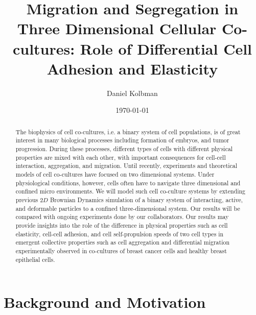 \documentclass[aps,prb,twocolumn,groupedaddress,nofootinbib,floatfix]{revtex4}
\begin{document}
%
\title{Migration and Segregation in Three Dimensional Cellular Co-cultures: Role of
Differential Cell Adhesion and Elasticity}

%
\author{Daniel Kolbman}
%
%
%

\date{\today}

\begin{abstract} \noindent The biophysics of cell co-cultures, i.e. a binary system of cell populations, is of great interest in many biological processes including formation of embryos, and tumor progression. 
During these processes, different types of cells with different physical properties are mixed with each other, with important consequences for cell-cell interaction, aggregation, and migration. 
Until recently, experiments and theoretical models of cell co-cultures have focused on two dimensional systems. Under physiological conditions, however, cells often have to  
navigate three dimensional and confined micro environments. We will model such cell co-culture systems by extending previous $2D$ Brownian Dynamics simulation of a binary system of interacting, 
active, and deformable particles to a confined three-dimensional system. Our results will be compared with ongoing experiments done by our collaborators. Our results may 
provide insights into the role of the difference in physical properties such as cell elasticity, cell-cell adhesion, and cell self-propulsion speeds of two cell types in emergent collective properties 
such as cell aggregation and differential migration experimentally observed in co-cultures of breast cancer cells and healthy breast epithelial cells.  

\end{abstract}

\maketitle

\section*{Background and Motivation}
\end{document}
